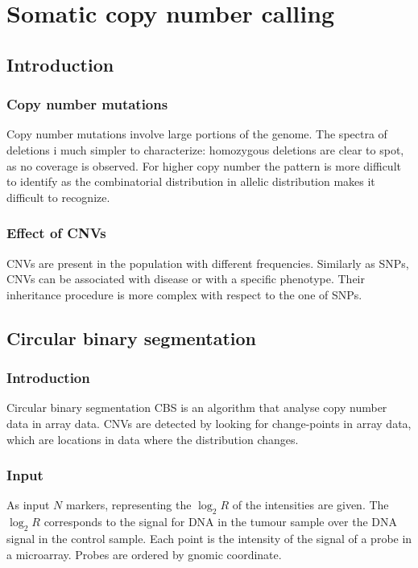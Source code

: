 \graphicspath{{chapters/laboratory/07/images/}}
\chapter{Somatic copy number calling}

\section{Introduction}

	\subsection{Copy number mutations}
	Copy number mutations involve large portions of the genome.
	The spectra of deletions i much simpler to characterize: homozygous deletions are clear to spot, as no coverage is observed.
	For higher copy number the pattern is more difficult to identify as the combinatorial distribution in allelic distribution makes it difficult to recognize.

	\subsection{Effect of CNVs}
	CNVs are present in the population with different frequencies.
	Similarly as SNPs, CNVs can be associated with disease or with a specific phenotype.
	Their inheritance procedure is more complex with respect to the one of SNPs.

	\section{Circular binary segmentation}

		\subsection{Introduction}
		Circular binary segmentation CBS is an algorithm that analyse copy number data in array data.
		CNVs are detected by looking for change-points in array data, which are locations in data where the distribution changes.

		\subsection{Input}
		As input $N$ markers, representing the $\log_2 R$ of the intensities are given.
		The $\log_2 R$ corresponds to the signal for DNA in the tumour sample over the DNA signal in the control sample.
		Each point is the intensity of the signal of a probe in a microarray.
		Probes are ordered by gnomic coordinate.

